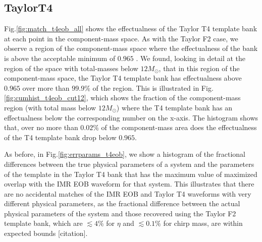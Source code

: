 \documentclass[aps,
prd,
amsmath,
amssymb,
twocolumn,
floatfix,
groupedaddress]{revtex4-1}
\begin{document}
\subsection{TaylorT4}\label{sec:level2:EffectualnessTaylorT4}
Fig.\ref{fig:match_t4eob_all} shows the effectualness of the Taylor T4 template bank at each point in the component-mass space. As with the Taylor F2 case, we observe a region of the component-mass space where the effectualness of the bank is above the acceptable minimum of $0.965$ \citep{WaveformAccuracy2008}. We found, looking in detail at the region of the space with total-masses below $12M_{\odot}$, that in this region of the component-mass space, the Taylor T4 template bank has effectualness above $0.965$ over more than $99.9\%$ of the region. This is illustrated in Fig.\ref{fig:cumhist_t4eob_cut12}, which shows the fraction of the component-mass region (with total mass below $12M_{\odot}$) where the T4 template bank has an effectualness below the corresponding number on the x-axis. The histogram shows that, over no more than $0.02\%$ of the component-mass area does the effectualness of the T4 template bank drop below $0.965$.

As before, in Fig.\ref{fig:errparams_t4eob}, we show a histogram of the fractional differences between the true physical parameters of a system and the parameters of the template in the Taylor T4 bank that has the maximum value of maximized overlap with the IMR EOB waveform for that system.
This illustrates that there are no accidental matches of the IMR EOB and Taylor T4 waveforms with very different physical parameters, as the fractional difference between the actual physical parameters of the system and those recovered using the Taylor F2 template bank, which are $\lesssim 4\%$ for $\eta$ and $\lesssim 0.1\%$ for chirp mass, are within expected bounds [citation].
\end{document}

